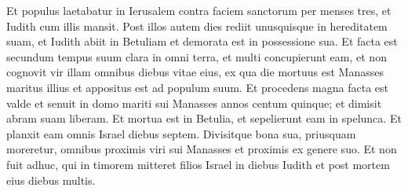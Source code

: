 \begin{biblechapter}
\verse Et populus laetabatur in Ierusalem contra faciem sanctorum per menses tres, et Iudith cum illis mansit. 
\verse Post illos autem dies rediit unusquisque in hereditatem suam, et Iudith abiit in Betuliam et demorata est in possessione sua. Et facta est secundum tempus suum clara in omni terra, 
\verse et multi concupierunt eam, et non cognovit vir illam omnibus diebus vitae eius, ex qua die mortuus est Manasses maritus illius et appositus est ad populum suum. 
\verse Et procedens magna facta est valde et senuit in domo mariti sui Manasses annos centum quinque; et dimisit abram suam liberam. Et mortua est in Betulia, et sepelierunt eam in spelunca. 
\verse Et planxit eam omnis Israel diebus septem. Divisitque bona sua, priusquam moreretur, omnibus proximis viri sui Manasses et proximis ex genere suo. 
\verse Et non fuit adhuc, qui in timorem mitteret filios Israel in diebus Iudith et post mortem eius diebus multis.
\end{biblechapter}

